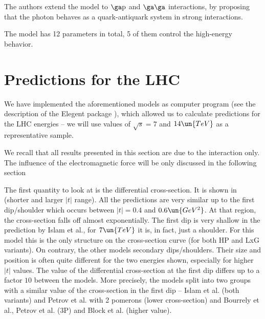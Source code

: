 The authors extend the model to $\rm\ga p$ and $\rm\ga\ga$ interactions, by proposing that the photon behaves as a quark-antiquark system in strong interactions.

The model has 12 parameters in total, 5 of them control the high-energy behavior.

\section[el pred]{Predictions for the LHC}

We have implemented the aforementioned models as computer program (see the description of the Elegent package ), which allowed us to calculate predictions for the LHC energies -- we will use values of $\sqrt s = 7$ and $14\un{TeV}$ as a representative sample.

We recall that all results presented in this section are due to the interaction only. The influence of the electromagnetic force will be only discussed in the following section

The first quantity to look at is the differential cross-section. It is shown in  (shorter and larger $|t|$ range). All the predictions are very similar up to the first dip/shoulder which occurs between $|t| = 0.4$ and $0.6\un{GeV^2}$. At that region, the cross-section falls off almost exponentially. The first dip is very shallow in the prediction by Islam et al., for $7\un{TeV}$ it is, in fact, just a shoulder. For this model this is the only structure on the cross-section curve (for both HP and LxG variants). On contrary, the other models secondary dips/shoulders. Their size and position is often quite different for the two energies shown, especially for higher $|t|$ values. The value of the differential cross-section at the first dip differs up to a factor $10$ between the models. More precisely, the models split into two groups with a similar value of the cross-section in the first dip -- Islam et al. (both variants) and Petrov et al. with 2 pomerons (lower cross-section) and Bourrely et al., Petrov et al. (3P) and Block et al. (higher value).




